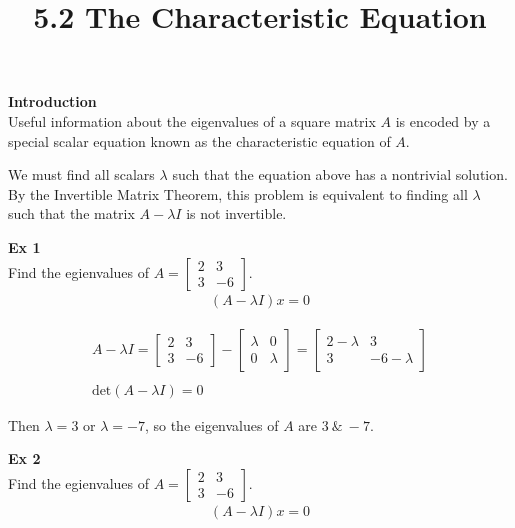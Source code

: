 \documentclass{article}
\title{5.2 The Characteristic Equation}
\begin{document}
  \maketitle
  \textbf{Introduction}\\
  Useful information about the eigenvalues of a square matrix $ A $ is encoded by a special scalar equation known as the characteristic equation of $ A $.

  We must find all scalars $ \lambda $ such that the equation above has a nontrivial solution. By the Invertible Matrix Theorem, this problem is equivalent to finding all $ \lambda $ such that the matrix $ A - \lambda I $ is not invertible.

  \textbf{Ex 1}\\
  Find the egienvalues of $ A=\begin{bmatrix}
    2 &3\\
    3 &-6
  \end{bmatrix} $.
  \[
    \begin{gathered}
      (A-\lambda I)x=0
    \end{gathered}
  \]

  \[
    \begin{gathered}
     A - \lambda I = \begin{bmatrix}
      2 &3\\
      3 &-6
    \end{bmatrix} -
    \begin{bmatrix}
      \lambda &0\\
      0 &\lambda
    \end{bmatrix} =
    \begin{bmatrix}
      2 -\lambda &3\\
      3 &-6-\lambda
    \end{bmatrix}\\
    ~\\
    \text{det}(A-\lambda I)=0
    \end{gathered}
  \]

  Then $ \lambda=3 $ or $ \lambda=-7 $, so the eigenvalues of $ A $ are $ 3 ~\&~ -7 $.

  \textbf{Ex 2}\\
  Find the egienvalues of $ A=\begin{bmatrix}
    2 &3\\
    3 &-6
  \end{bmatrix} $.
  \[
    \begin{gathered}
      (A-\lambda I)x=0
    \end{gathered}
  \]
\end{document}
